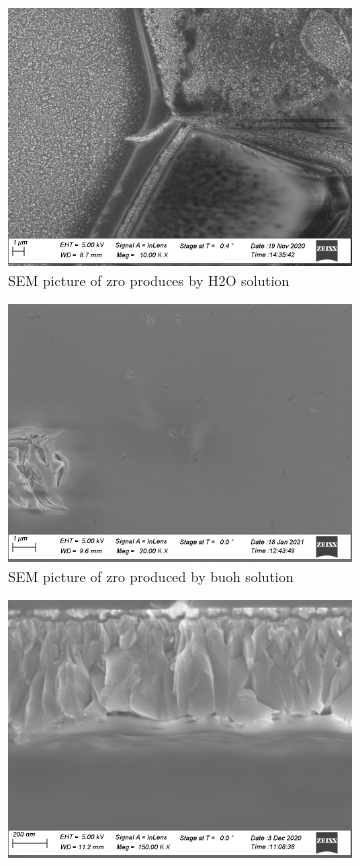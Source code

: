 \begin{figure}[bht]
    \centering
    \begin{subfigure}{.45\textwidth}
        \centering
        \includegraphics[width=.79\textwidth]{Pics/sem/071_fto_old_1x1F.png}
        \caption{SEM picture of \gls{zro} produces by H2O solution} \label{fig:sem-old}
    \end{subfigure}
    \begin{subfigure}{.45\textwidth}
        \centering
        \includegraphics[width=.79\textwidth]{Pics/sem/147_steel_ph_10x.png}
        \caption{SEM picture of \gls{zro} produced by buoh solution} \label{fig:sem-ph}
    \end{subfigure}
    \begin{subfigure}{.45\textwidth}
        \centering
        \includegraphics[width=.8\textwidth]{Pics/sem/115_fto_cs_1x.png}

\end{subfigure}
\end{figure}
